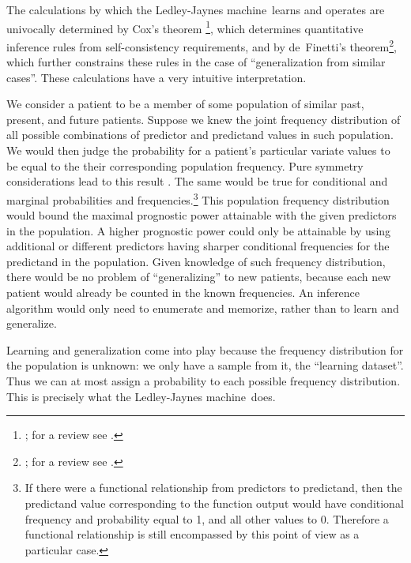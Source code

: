 \documentclass[utf8]{FrontiersinHarvard} %
\newcommand*{\sects}{\S\S}%
\renewcommand*{\|}[1][]{\nonscript\:#1\vert\nonscript\:\mathopen{}}
\newcommand*{\ljm}{Ledley-Jaynes machine}
\begin{document}
The calculations by which the \ljm\ learns and operates are univocally determined by Cox's theorem \footnote{\citealp{cox1946,cox1961,polya1954,polya1954b_r1968,tribus1969,rosenkrantz1977,snow1998,halpern1999b,arnborgetal2001,snow2001,claytonetal2017}; for a review see \citealp{vanhorn2003}.}, which determines quantitative inference rules from self-consistency requirements, and by de~Finetti's theorem\footnote{\citealp[\sects~4.2--4.3]{definetti1930,definetti1937,bernardoetal1994_r2000}; for a review see \citealp{dawid2013}.}, which further constrains these rules in the case of \enquote{generalization from similar cases}. These calculations have a very intuitive interpretation.

We consider a patient to be a member of some population of similar past, present, and future patients. Suppose we knew the joint frequency distribution of all possible combinations of predictor and predictand values in such population. We would then judge the probability for a patient's particular variate values to be equal to the their corresponding population frequency. Pure symmetry considerations lead to this result \citep[\sects~4.2--4.3]{definetti1930,dawid2013,bernardoetal1994_r2000}. The same would be true for conditional and marginal probabilities and frequencies.\footnote{If there were a functional relationship from predictors to predictand, then the predictand value corresponding to the function output would have conditional frequency and probability equal to 1, and all other values to 0. Therefore a functional relationship is still encompassed by this point of view as a particular case.} This population frequency distribution would bound the maximal prognostic power attainable with the given predictors in the population. A higher prognostic power could only be attainable by using additional or different predictors having sharper conditional frequencies for the predictand in the population. Given knowledge of such frequency distribution, there would be no problem of \enquote{generalizing} to new patients, because each new patient would already be counted in the known frequencies. An inference algorithm would only need to enumerate and memorize, rather than to learn and generalize.

Learning and generalization come into play because the frequency distribution for the population is unknown: we only have a sample from it, the \enquote{learning dataset}. Thus we can at most assign a probability to each possible frequency distribution. This is precisely what the \ljm\ does.
\end{document}
